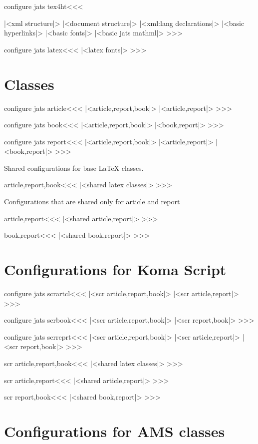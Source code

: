 \<configure jats tex4ht\><<<
|<xml structure|>
|<document structure|>
|<xml:lang declarations|>
|<basic hyperlinks|>
|<basic fonts|>
|<basic jats mathml|>
>>>

\<configure jats latex\><<<
|<latex fonts|>
>>>

\section{Classes}


\<configure jats article\><<<
|<article,report,book|>
|<article,report|>
>>>

\<configure jats book\><<<
|<article,report,book|>
|<book,report|>
>>>

\<configure jats report\><<<
|<article,report,book|>
|<article,report|>
|<book,report|>
>>>

Shared configurations for base LaTeX classes.

\<article,report,book\><<<
|<shared latex classes|>
>>>

Configurations that are shared only for article and report

\<article,report\><<<
|<shared article,report|>
>>>

\<book,report\><<<
|<shared book,report|>
>>>

\section{Configurations for Koma Script}

\<configure jats scrartcl\><<<
|<scr article,report,book|>
|<scr article,report|>
>>>

\<configure jats scrbook\><<<
|<scr article,report,book|>
|<scr report,book|>
>>>

\<configure jats scrreprt\><<<
|<scr article,report,book|>
|<scr article,report|>
|<scr report,book|>
>>>

\<scr article,report,book\><<<
|<shared latex classes|>
>>>

\<scr article,report\><<<
|<shared article,report|>
>>>

\<scr report,book\><<<
|<shared book,report|>
>>>

\section{Configurations for AMS classes}

